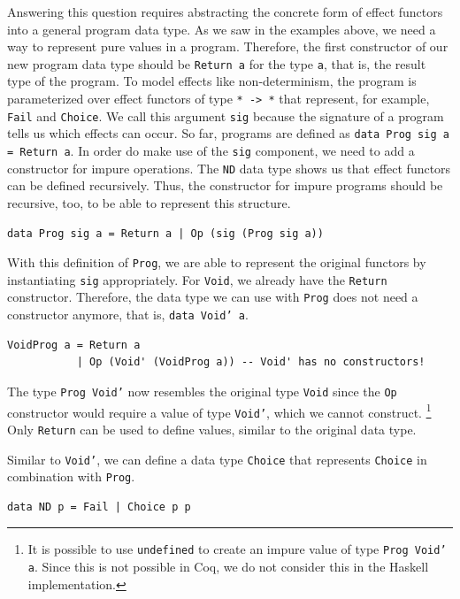\documentclass[a4paper, 11pt, fleqn, twoside]{scrreprt}
\newcommand{\hinl}[1]{\texttt{#1}}
\begin{document}
Answering this question requires abstracting the concrete form of effect functors into a general program data type.
As we saw in the examples above, we need a way to represent pure values in a program.
Therefore, the first constructor of our new program data type should be \hinl{Return a} for the type \hinl{a}, that is, the result type of the program.
To model effects like non-determinism, the program is parameterized over effect functors of type \hinl{* -> *} that represent, for example, \hinl{Fail} and \hinl{Choice}.
We call this argument \hinl{sig} because the signature of a program tells us which effects can occur.
So far, programs are defined as \hinl{data Prog sig a = Return a}.
In order do make use of the \hinl{sig} component, we need to add a constructor for impure operations.
The \hinl{ND} data type shows us that effect functors can be defined recursively.
Thus, the constructor for impure programs should be recursive, too, to be able to represent this structure.

\begin{verbatim}
data Prog sig a = Return a | Op (sig (Prog sig a))
\end{verbatim}

With this definition of \hinl{Prog}, we are able to represent the original functors by instantiating \hinl{sig} appropriately.
For \hinl{Void}, we already have the \hinl{Return} constructor.
Therefore, the data type we can use with \hinl{Prog} does not need a constructor anymore, that is, \hinl{data Void' a}.

\begin{verbatim}
VoidProg a = Return a
           | Op (Void' (VoidProg a)) -- Void' has no constructors!
\end{verbatim}

The type \hinl{Prog Void'} now resembles the original type  \hinl{Void} since the \hinl{Op} constructor  would require a value of type \hinl{Void'}, which we cannot  construct.
\footnote{It is possible to use \hinl{undefined} to create an impure value of type \hinl{Prog Void' a}.
Since this  is not possible in Coq, we do not consider this in the Haskell implementation.}
Only \hinl{Return} can be used to define values, similar to the  original data type.

Similar to \hinl{Void'}, we can define a data type  \hinl{Choice} that represents \hinl{Choice} in combination with \hinl{Prog}.

\label{min:ND}
\begin{verbatim}
data ND p = Fail | Choice p p
\end{verbatim}
\end{document}
